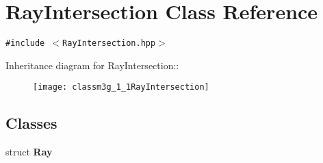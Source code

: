 \hypertarget{classm3g_1_1RayIntersection}{
\section{RayIntersection Class Reference}
\label{classm3g_1_1RayIntersection}
}
{\tt \#include $<$RayIntersection.hpp$>$}

Inheritance diagram for RayIntersection::\begin{figure}[H]
\begin{center}
\leavevmode
\texttt{[image: classm3g\_1\_1RayIntersection]}
\end{center}
\end{figure}
\subsection*{Classes}
\begin{CompactItemize}
\item 
struct \textbf{Ray}
\end{CompactItemize}
